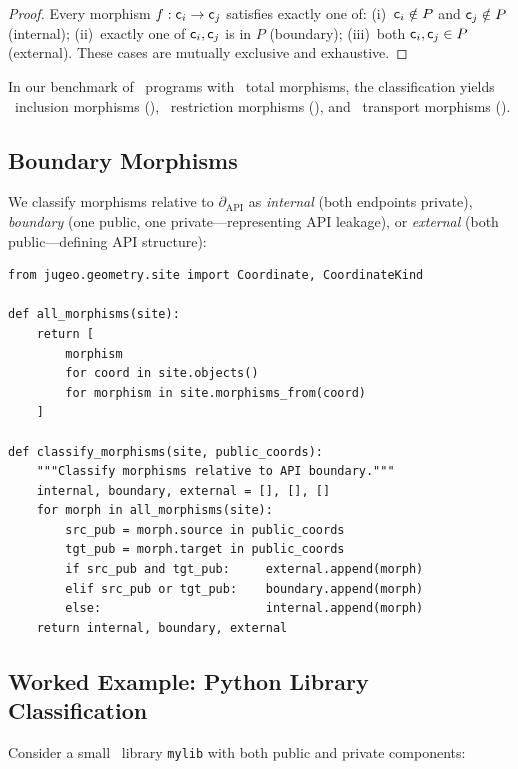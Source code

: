 \documentclass[11pt]{article}
\newcommand{\APIBoundary}{\partial_{\mathrm{API}}}
\begin{document}
\begin{proof}
Every morphism $f : \mathsf{c}_i \to \mathsf{c}_j$ satisfies exactly one of:
(i)~$\mathsf{c}_i \notin P$ and $\mathsf{c}_j \notin P$ (internal);
(ii)~exactly one of $\mathsf{c}_i, \mathsf{c}_j$ is in $P$ (boundary);
(iii)~both $\mathsf{c}_i, \mathsf{c}_j \in P$ (external).
These cases are mutually exclusive and exhaustive.
\end{proof}

In our benchmark of \compTotalPrograms\ programs with \compMorphTotal\
total morphisms, the classification yields \compMorphInclusion\ inclusion
morphisms (\compMorphInclusionPct), \compMorphRestriction\ restriction
morphisms (\compMorphRestrictionPct), and \compMorphTransport\ transport
morphisms (\compMorphTransportPct).

\subsection{Boundary Morphisms}
We classify morphisms relative to $\APIBoundary$ as \emph{internal} (both
endpoints private), \emph{boundary} (one public, one private---representing
API leakage), or \emph{external} (both public---defining API structure):

\begin{lstlisting}[style=jugeo-python]
from jugeo.geometry.site import Coordinate, CoordinateKind

def all_morphisms(site):
    return [
        morphism
        for coord in site.objects()
        for morphism in site.morphisms_from(coord)
    ]

def classify_morphisms(site, public_coords):
    """Classify morphisms relative to API boundary."""
    internal, boundary, external = [], [], []
    for morph in all_morphisms(site):
        src_pub = morph.source in public_coords
        tgt_pub = morph.target in public_coords
        if src_pub and tgt_pub:     external.append(morph)
        elif src_pub or tgt_pub:    boundary.append(morph)
        else:                       internal.append(morph)
    return internal, boundary, external
\end{lstlisting}

\subsection{Worked Example: Python Library Classification}\label{sec:worked-example}

Consider a small \Python\ library \texttt{mylib} with both public and
private components:
\end{document}
